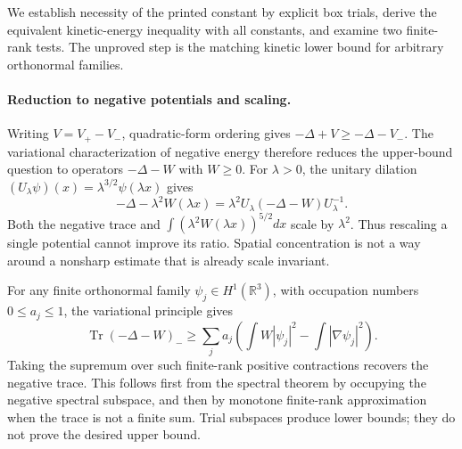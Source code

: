 \documentclass[11pt]{article}
\begin{document}
We establish necessity of the printed constant by explicit box
trials, derive the equivalent kinetic-energy inequality with all
constants, and examine two finite-rank tests. The unproved step is
the matching kinetic lower bound for arbitrary orthonormal families.

\paragraph{Reduction to negative potentials and scaling.}
Writing $V=V_+-V_-$, quadratic-form ordering gives
$-\Delta+V\geq-\Delta-V_-$. The variational characterization of
negative energy therefore reduces the upper-bound question to
operators $-\Delta-W$ with $W\geq0$. For $\lambda>0$, the unitary
dilation $(U_\lambda\psi)(x)=\lambda^{3/2}\psi(\lambda x)$ gives
\[
 -\Delta-\lambda^2W(\lambda x)
     =\lambda^2U_\lambda(-\Delta-W)U_\lambda^{-1}.
\]
Both the negative trace and $\int(\lambda^2W(\lambda x))^{5/2}dx$
scale by $\lambda^2$. Thus rescaling a single potential cannot
improve its ratio. Spatial concentration is not a way around a
nonsharp estimate that is already scale invariant.

For any finite orthonormal family $\psi_j\in H^1(\mathbb R^3)$,
with occupation numbers $0\leq a_j\leq1$, the variational principle
gives
\[
 \operatorname{Tr}(-\Delta-W)_-
 \geq\sum_j a_j\left(\int W|\psi_j|^2-\int|\nabla\psi_j|^2\right).
 \tag{386.1}
\]
Taking the supremum over such finite-rank positive contractions
recovers the negative trace. This follows first from the spectral
theorem by occupying the negative spectral subspace, and then by
monotone finite-rank approximation when the trace is not a finite
sum. Trial subspaces produce lower bounds; they do not prove the
desired upper bound.
\end{document}

